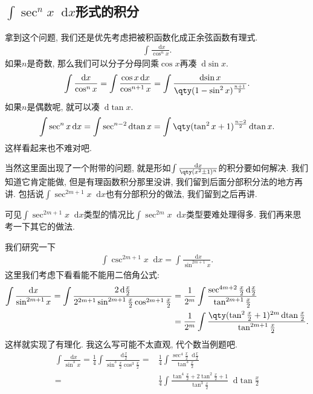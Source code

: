 \documentclass{ctexbook}
\newcommand*{\dif}{\mathop{}\!\mathrm{d}}
\begin{document}
{\subsection{$\int\sec^{n}{x}\dif{x}$形式的积分}
拿到这个问题, 我们还是优先考虑把被积函数化成正余弦函数有理式. 
\begin{align*}
\int\frac{\dif{x}}{\cos^{n}{x}}
.\end{align*}
如果$n$是奇数, 那么我们可以分子分母同乘$\cos{x}$再凑$\dif{\sin{x}}$. 
\begin{align*}
\int\frac{\dif{x}}{\cos^{n}{x}}=\int\frac{\cos{x}\dif{x}}{\cos^{n+1}{x}}=\int\frac{\dif{\sin{x}}}{\qty(1-\sin^{2}{x})^{\frac{n+1}{2}}}
.\end{align*}
如果$n$是偶数呢, 就可以凑$\dif{\tan{x}}$. 
\begin{align*}
\int\sec^{n}{x}\dif{x}=\int\sec^{n-2}\dif{\tan{x}}=\int\qty(\tan^{2}{x}+1)^{\frac{n-2}{2}}\dif{\tan{x}}
.\end{align*}
这样看起来也不难对吧. \par
当然这里面出现了一个附带的问题, 就是形如$\int\frac{\dif{x}}{\qty(x^{2}\pm1)^{n}}$的积分要如何解决. 我们知道它肯定能做, 但是有理函数积分那里没讲, 我们留到后面分部积分法的地方再讲. 包括说$\int\sec^{2m+1}{x}\dif{x}$也有分部积分的做法, 我们留到之后再讲. \par
可见$\int\sec^{2m+1}{x}\dif{x}$类型的情况比$\int\sec^{2m}{x}\dif{x}$类型要难处理得多. 我们再来思考一下其它的做法. \par
我们研究一下
\begin{align*}
\int\csc^{2m+1}{x}\dif{x}=\int\frac{\dif{x}}{\sin^{2m+1}{x}}
.\end{align*}
这里我们考虑下看看能不能用二倍角公式: 
\begin{align*}
\int\frac{\dif{x}}{\sin^{2m+1}{x}}=\int\frac{2\dif{\frac{x}{2}}}{2^{2m+1}\sin^{2m+1}{\frac{x}{2}}\cos^{2m+1}{\frac{x}{2}}}={}&\frac{1}{2^{m}}\int\frac{\sec^{4m+2}{\frac{x}{2}}\dif{\frac{x}{2}}}{\tan^{2m+1}{\frac{x}{2}}}\\
={}&\frac{1}{2^{m}}\int\frac{\qty(\tan^{2}{\frac{x}{2}}+1)^{2m}\dif{\tan{\frac{x}{2}}}}{\tan^{2m+1}{\frac{x}{2}}}
.\end{align*}
这样就实现了有理化. 我这么写可能不太直观, 代个数当例题吧. 
\begin{align*}
\int\frac{\dif{x}}{\sin^{3}{x}}=\frac{1}{4}\int\frac{\dif{\frac{x}{2}}}{\sin^{3}{\frac{x}{2}}\cos^{3}{\frac{x}{2}}}={}&\frac{1}{4}\int\frac{\sec^{4}{\frac{x}{2}}\dif{\frac{x}{2}}}{\tan^{3}{\frac{x}{2}}}\\
={}&\frac{1}{4}\int\frac{\tan^{4}{\frac{x}{2}}+2\tan^{2}{\frac{x}{2}}+1}{\tan^{3}{\frac{x}{2}}}\dif{\tan{\frac{x}{2}}}

\end{align*}}
\end{document}
